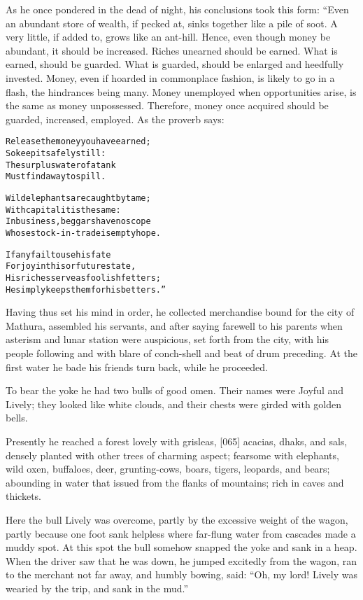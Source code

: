 \documentclass{article}
\renewenvironment{verbatim}{\begin{alltt}\normalfont\begin{centering}}{\end{centering}\end{alltt}}
\begin{document}
As he once pondered in the dead of night, his conclusions took this
form: “Even an abundant store of wealth, if pecked at, sinks
together like a pile of soot. A very little, if added to, grows
like an ant-hill. Hence, even though money be abundant, it should
be increased. Riches unearned should be earned. What is earned,
should be guarded. What is guarded, should be enlarged and
heedfully invested. Money, even if hoarded in commonplace fashion,
is likely to go in a flash, the hindrances being many. Money
unemployed when opportunities arise, is the same as money
unpossessed. Therefore, money once acquired should be guarded,
increased, employed. As the proverb says:

\begin{verbatim}
Release the money you have earned;
    So keep it safely still:
The surplus water of a tank
    Must find a way to spill.

Wild elephants are caught by tame;
With capital it is the same:
In business, beggars have no scope
Whose stock-in-trade is empty hope.

If any fail to use his fate
For joy in this or future state,
His riches serve as foolish fetters;
He simply keeps them for his betters.”
\end{verbatim}
Having thus set his mind in order, he collected merchandise bound
for the city of Mathura, assembled his servants, and after saying
farewell to his parents when asterism and lunar station were
auspicious, set forth from the city, with his people following and
with blare of conch-shell and beat of drum preceding. At the first
water he bade his friends turn back, while he proceeded.

To bear the yoke he had two bulls of good omen. Their names were
Joyful and Lively; they looked like white clouds, and their chests
were girded with golden bells.

Presently he reached a forest lovely with grisleas, [065] acacias,
dhaks, and sals, densely planted with other trees of charming
aspect; fearsome with elephants, wild oxen, buffaloes, deer,
grunting-cows, boars, tigers, leopards, and bears; abounding in
water that issued from the flanks of mountains; rich in caves and
thickets.

Here the bull Lively was overcome, partly by the excessive weight
of the wagon, partly because one foot sank helpless where far-flung
water from cascades made a muddy spot. At this spot the bull
somehow snapped the yoke and sank in a heap. When the driver saw
that he was down, he jumped excitedly from the wagon, ran to the
merchant not far away, and humbly bowing, said:
``Oh, my lord! Lively was wearied by the trip, and sank in the mud.''
\end{document}
